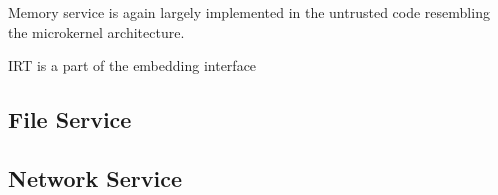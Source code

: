 Memory service is again largely implemented in the untrusted code
resembling the microkernel architecture.

IRT is a part of the embedding interface



\subsection{File Service}
\label{sub:file_service}

\subsection{Network Service}
\label{sub:network_service}
